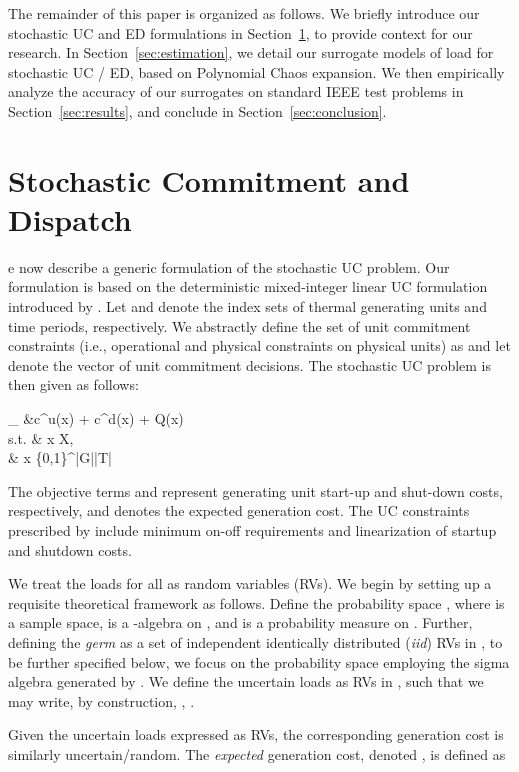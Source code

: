 \documentclass[conference]{IEEEtran}
\begin{document}
The remainder of this paper is organized as follows. We briefly
introduce our stochastic UC and ED formulations in Section~\ref{sec:suc}, to
provide context for our research. In Section~\ref{sec:estimation}, we
detail our surrogate models of load for stochastic UC / ED, based on 
Polynomial Chaos expansion. We then empirically analyze the accuracy
of our surrogates on standard IEEE test problems in 
Section~\ref{sec:results}, and conclude in Section~\ref{sec:conclusion}.
 

\section{Stochastic Commitment and Dispatch}
\label{sec:suc}

e now describe a generic formulation of the stochastic UC problem. 
Our formulation is based on the deterministic mixed-integer linear 
UC formulation introduced by \cite{carrionarroyo06}.  Let  and  
denote the index sets of thermal generating units and time periods, 
respectively. We abstractly define the set of unit commitment constraints 
(i.e., operational and physical constraints on physical units) as  and let  denote the vector of unit commitment decisions. 
The stochastic UC problem is then given as follows:


\min_{ } \quad  &c^u(\boldsymbol x) +
c^d(\boldsymbol x) + \overline Q(\boldsymbol x) \\
\textmd{s.t.} \quad & \boldsymbol x \in \mathcal X,\\
& \boldsymbol x \in \{0,1\}^{|G|\times |T|}


The objective terms  and 
represent generating unit start-up and shut-down costs, respectively, 
and  denotes the expected generation
cost.  The UC constraints prescribed by  include minimum on-off requirements and
linearization of startup and shutdown costs.


We treat the loads  for all  as random variables (RVs).
We begin by setting up a requisite theoretical framework as follows.
Define the probability space , where  is a sample
space,  is a -algebra on , and  is a probability
measure on . Further, defining the \emph{germ}
 as a set of independent identically distributed
(\emph{iid}) RVs in , to be further specified
below, we focus on the probability space  employing the
sigma algebra generated by . We define the uncertain loads as RVs
 in
, such that we may write, by construction, 
, .

Given the uncertain loads expressed as RVs, the corresponding generation cost 
 is similarly uncertain/random. The
\emph{expected} generation cost, denoted , is
defined as 
\end{document}
